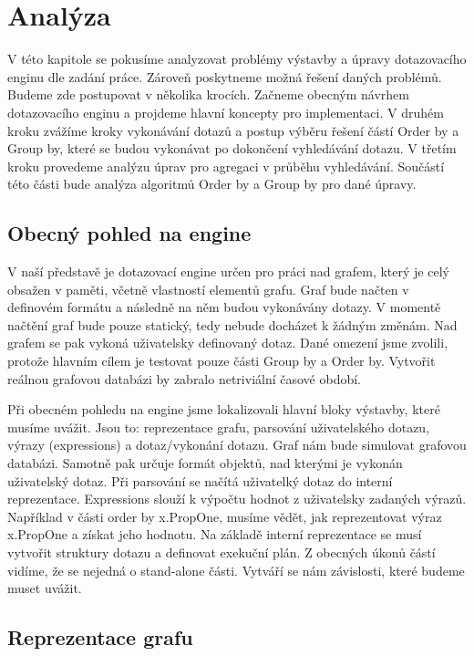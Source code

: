 

\chapter{Analýza}

V této kapitole se pokusíme analyzovat problémy výstavby a úpravy dotazovacího enginu dle zadání práce.
Zároveň poskytneme možná řešení daných problémů.
Budeme zde postupovat v několika krocích. 
Začneme obecným návrhem dotazovacího enginu a projdeme hlavní koncepty pro implementaci.
V druhém kroku zvážíme kroky vykonávání dotazů a postup výběru řešení částí Order by a Group by, které se budou vykonávat po dokončení vyhledávání dotazu.
V třetím kroku provedeme analýzu úprav pro agregaci v průběhu vyhledávání. 
Součástí této části bude analýza algoritmů Order by a Group by pro dané úpravy. 

\section{Obecný pohled na engine}

V naší představě je dotazovací engine určen pro práci nad grafem, který je celý obsažen v paměti, včetně vlastností elementů grafu.
Graf bude načten v definovém formátu a následně na něm budou vykonávány dotazy.
V momentě načtění graf bude pouze statický, tedy nebude docházet k žádným změnám.
Nad grafem se pak vykoná uživatelsky definovaný dotaz.
Dané omezení jsme zvolili, protože hlavním cílem je testovat pouze části Group by a Order by.
Vytvořit reálnou grafovou databázi by zabralo netriviální časové období.

Při obecném pohledu na engine jsme lokalizovali hlavní bloky výstavby, které musíme uvážit.
Jsou to: reprezentace grafu, parsování uživatelského dotazu, výrazy (expressions) a dotaz/vykonání dotazu.
Graf nám bude simulovat grafovou databázi. 
Samotně pak určuje formát objektů, nad kterými je vykonán uživatelský dotaz.
Při parsování se načítá uživatelký dotaz do interní reprezentace.
Expressions slouží k výpočtu hodnot z uživatelsky zadaných výrazů.
Například v části order by x.PropOne, musíme vědět, jak reprezentovat výraz x.PropOne a získat jeho hodnotu. 
Na základě interní reprezentace se musí vytvořit struktury dotazu a definovat exekuční plán. 
Z obecných úkonů částí vidíme, že se nejedná o stand-alone části.
Vytváří se nám závislosti, které budeme muset uvážit.

\section{Reprezentace grafu} \label{anal.grafrep}

